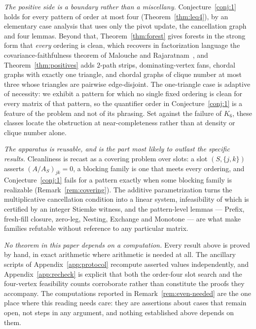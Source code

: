 \documentclass[11pt]{article}
\theoremstyle{plain}
\theoremstyle{definition}
\begin{document}
\begin{humanblock}
\emph{The positive side is a boundary rather than a miscellany.} Conjecture~\ref{conj:1} holds for
every pattern of order at most four (Theorem~\ref{thm:leq4}), by an elementary case analysis that uses
only the pivot update, the cancellation graph and four lemmas. Beyond that, Theorem~\ref{thm:forest}
gives forests in the strong form that \emph{every} ordering is clean, which recovers in factorization
language the covariance-faithfulness theorem of Malouche and Rajaratnam~\cite{Malouche}, and
Theorem~\ref{thm:positives} adds $2$-path strips, dominating-vertex fans, chordal graphs with exactly
one triangle, and chordal graphs of clique number at most three whose triangles are pairwise
edge-disjoint. The one-triangle case is adaptive of necessity: we exhibit a pattern for which no single
fixed ordering is clean for every matrix of that pattern, so the quantifier order in
Conjecture~\ref{conj:1} is a feature of the problem and not of its phrasing. Set against the failure of
$K_6$, these classes locate the obstruction at near-completeness rather than at density or clique
number alone.

\emph{The apparatus is reusable, and is the part most likely to outlast the specific results.}
Cleanliness is recast as a covering problem over slots: a slot $(S,\{j,k\})$ asserts
$(A/A_S)_{jk}=0$, a blocking family is one that meets every ordering, and
Conjecture~\ref{conj:1} fails for a pattern exactly when some blocking family is realizable
(Remark~\ref{rem:covering}). The additive parametrization turns the multiplicative cancellation
condition into a linear system, infeasibility of which is certified by an integer Stiemke witness, and
the pattern-level lemmas --- Prefix, fresh-fill closure, zero-leg, Nesting, Exchange and Monotone ---
are what make families refutable without reference to any particular matrix.

\emph{No theorem in this paper depends on a computation.} Every result above is proved by hand, in
exact arithmetic where arithmetic is needed at all. The ancillary scripts of
Appendix~\ref{app:protocol} recompute asserted values independently, and
Appendix~\ref{app:recheck} is explicit that both the order-four slot search and the four-vertex
feasibility counts corroborate rather than constitute the proofs they accompany. The computations
reported in Remark~\ref{rem:even-needed} are the one place where this reading needs care: they are
assertions about cases that remain open, not steps in any argument, and nothing established above
depends on them.


\end{humanblock}
\end{document}

